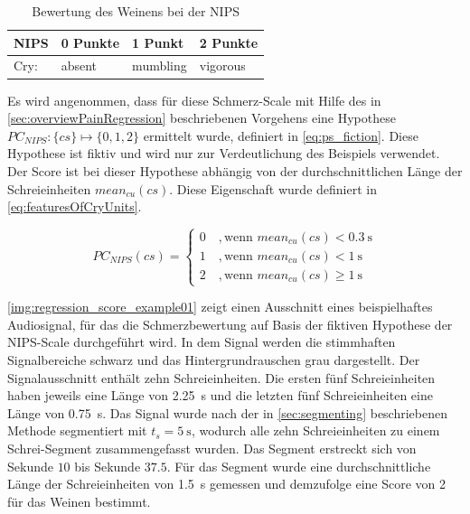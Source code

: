 \begin{table}[h]
\footnotesize
\centering
\caption[Bewertung des Weinens bei der NIPS]{Bewertung des Weinens bei der NIPS \cite{nips}}
\label{tab:fiction_scale}
\begin{tabular}{@{}llll@{}}
\toprule
NIPS              & 0 Punkte    & 1 Punkt         & 2 Punkte       \\ \midrule
Cry: & absent & mumbling & vigorous \\ \bottomrule
\end{tabular}
\end{table}

Es wird angenommen, dass für diese Schmerz-Scale mit Hilfe des in \autoref{sec:overviewPainRegression} beschriebenen Vorgehens eine Hypothese $PC_{NIPS}: \{cs\} \mapsto \{0,1,2\}$ ermittelt wurde, definiert in \autoref{eq:ps_fiction}. Diese Hypothese ist fiktiv und wird nur zur Verdeutlichung des Beispiels verwendet. Der Score ist bei dieser Hypothese abhängig von der durchschnittlichen Länge der Schreieinheiten $mean_{cu}(cs)$. Diese Eigenschaft wurde definiert in \autoref{eq:featuresOfCryUnits}.

\begin{equation}
PC_{NIPS}(cs) = \begin{cases}
 0 \quad ,  \text{wenn } mean_{cu}(cs) < \SI{0.3}{\second} \\
 1 \quad ,  \text{wenn } mean_{cu}(cs) < \SI{1}{\second} \\
 2 \quad ,  \text{wenn } mean_{cu}(cs) \geq \SI{1}{\second}
 \end{cases}	
 \label{eq:ps_fiction}
\end{equation}

\autoref{img:regression_score_example01} zeigt einen Ausschnitt eines beispielhaftes Audiosignal, für das die Schmerzbewertung auf Basis der fiktiven Hypothese der NIPS-Scale durchgeführt wird. In dem Signal werden die stimmhaften Signalbereiche schwarz und das Hintergrundrauschen grau dargestellt. Der Signalausschnitt enthält zehn Schreieinheiten. Die ersten fünf Schreieinheiten haben jeweils eine Länge von \SI{2.25}{\second} und die letzten fünf Schreieinheiten eine Länge von \SI{0.75}{\second}. Das Signal wurde nach der in \autoref{sec:segmenting} beschriebenen Methode segmentiert mit $t_s = \SI{5}{\second}$, wodurch alle zehn Schreieinheiten zu einem Schrei-Segment zusammengefasst wurden. Das Segment erstreckt sich von Sekunde $10$ bis Sekunde $37.5$. Für das Segment wurde eine durchschnittliche Länge der Schreieinheiten von \SI{1.5}{\second} gemessen und demzufolge eine Score von 2 für das Weinen bestimmt.

